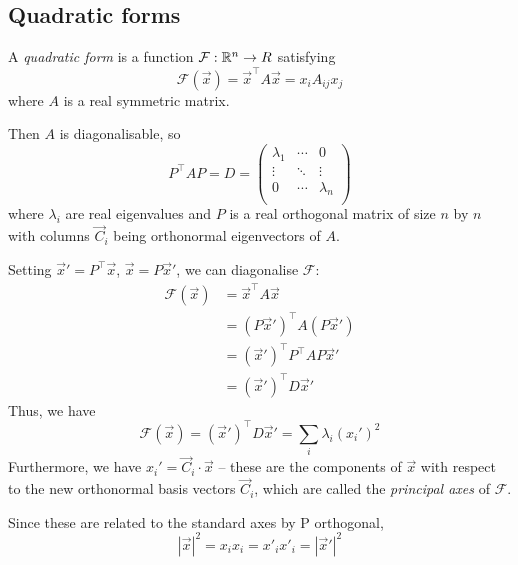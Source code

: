 \documentclass{../template/note}
\begin{document}
    \subsection{Quadratic forms}

    \begin{definition}
        A \emph{quadratic form} is a function \(\mathcal F: \mathbb R^n \to R\) satisfying
        \[
            \mathcal F(\vec x) = \vec x^\intercal A \vec x = x_i A_{ij} x_j
        \]
        where \(A\) is a real symmetric matrix.
    \end{definition}
    Then \(A\) is diagonalisable, so
    \[
        P^\intercal AP = D = \begin{pmatrix}
            \lambda_1 & \cdots & 0 \\
            \vdots & \ddots & \vdots \\
            0 & \cdots & \lambda_n \\
        \end{pmatrix}
    \]
    where \(\lambda_i\) are real eigenvalues and \(P\) is a real orthogonal matrix of size \(n\) by \(n\) with columns \(\vec C_i\) being orthonormal eigenvectors of \(A\).

    Setting \(\vec x' = P^\intercal \vec x\), \(\vec x = P \vec x'\), we can diagonalise \(\mathcal F\):
    \begin{align*}
        \mathcal F(\vec x) &= \vec x^\intercal A \vec x \\
        &= (P \vec x')^\intercal A (P \vec x') \\
        &= (\vec x')^\intercal P^\intercal A P \vec x' \\
        &= (\vec x')^\intercal D \vec x'
    \end{align*}
    Thus, we have
    \[
        \mathcal F(\vec x) = (\vec x')^\intercal D \vec x' = \sum_{i} \lambda_i (x_i')^2
    \]
    Furthermore, we have \(x_i' = \vec C_i \cdot \vec x\) -- these are the components of \(\vec x\) with respect to the new orthonormal basis vectors \(\vec C_i\), which are called the \emph{principal axes} of \(\mathcal F\).

    Since these are related to the standard axes by P orthogonal,
    \[
        |\vec x|^2 = x_ix_i = x'_i x'_i = |\vec x'|^2
    \]
    
\end{document}
